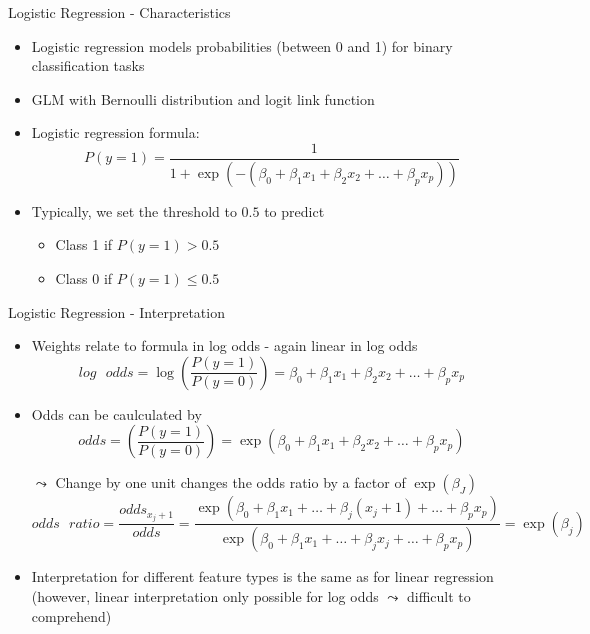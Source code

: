 \documentclass[11pt,compress,t,notes=noshow, aspectratio=169, xcolor=table]{beamer}
\begin{document}
\begin{frame}{Logistic Regression - Characteristics}

\begin{itemize}
    \item Logistic regression models probabilities (between 0 and 1) for binary classification tasks 
    \item GLM with Bernoulli distribution and logit link function
    \item Logistic regression formula:
    $$P(y = 1) =\frac{1}{1 + \exp(-( \beta_0 + \beta_1 x_1 + \beta_2 x_2 + \ldots + \beta_p x_p ))} $$
    \item Typically, we set the threshold to $0.5$ to predict 
        \begin{itemize}
            \item Class 1 if $P(y=1) > 0.5$
            \item Class 0 if $P(y=1) \leq 0.5$
        \end{itemize}
\end{itemize}
    

	

\end{frame}


\begin{frame}[c]{Logistic Regression - Interpretation}

    
    
    
    

    \begin{itemize}
        \item Weights relate to formula in log odds - again linear in log odds
        $$log\text{ }odds = \log \left(\frac{P(y = 1)}{P(y=0)}\right) = \beta_0 + \beta_1 x_1 + \beta_2 x_2 + \ldots + \beta_p x_p  $$
        \pause
        \item Odds can be caulculated by 
        $$odds = \left(\frac{P(y = 1)}{P(y=0)}\right) = \exp(\beta_0 + \beta_1 x_1 + \beta_2 x_2 + \ldots + \beta_p x_p)  $$
        \item[$\leadsto$] Change by one unit changes the odds ratio by a \alert{factor} of $\exp(\beta_J)$
        $$odds\text{ }ratio = \frac{odds_{x_j+1}}{odds} = \frac{\exp(\beta_0 + \beta_1 x_1 + \ldots + \beta_j (x_j+1) + \ldots + \beta_p x_p)}{\exp(\beta_0 + \beta_1 x_1 + \ldots + \beta_j x_j + \ldots + \beta_p x_p)} = \exp{(\beta_j)} $$
        \pause
        \item Interpretation for different feature types is the same as for linear regression (however, linear interpretation only possible for log odds $\leadsto$ difficult to comprehend)
    \end{itemize}	

\end{frame}
\end{document}
